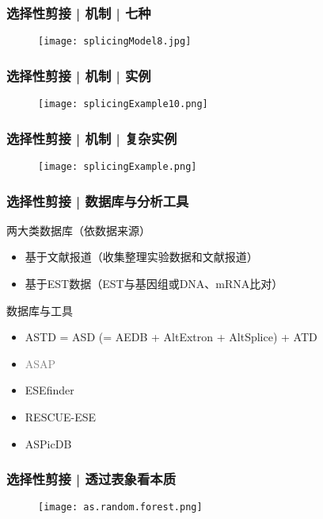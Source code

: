\begin{frame}
  \frametitle{选择性剪接 | \alert{机制} | 七种}
  \begin{figure}
    \centering
    \texttt{[image: splicingModel8.jpg]}
  \end{figure}
\end{frame}

\begin{frame}
  \frametitle{选择性剪接 | 机制 | 实例}
  \begin{figure}
    \centering
    \texttt{[image: splicingExample10.png]}
  \end{figure}
\end{frame}

\begin{frame}
  \frametitle{选择性剪接 | 机制 | 复杂实例}
  \begin{figure}
    \centering
    \texttt{[image: splicingExample.png]}
  \end{figure}
\end{frame}

\begin{frame}
  \frametitle{选择性剪接 | 数据库与分析工具}
  \begin{block}{两大类数据库（依数据来源）}
    \begin{itemize}
      \item 基于文献报道（收集整理实验数据和文献报道）
      \item 基于EST数据（EST与基因组或DNA、mRNA比对）
    \end{itemize}
  \end{block}
  \pause
  \begin{block}{数据库与工具}
  \begin{itemize}
    \item ASTD = ASD (= AEDB + AltExtron + AltSplice) + ATD
    \item \textcolor{gray}{ASAP}
    \item ESEfinder 
    \item RESCUE-ESE
    \item ASPicDB
  \end{itemize}
\end{block}
\end{frame}

\begin{frame}
  \frametitle{选择性剪接 | 透过表象看本质}
  \begin{figure}
    \centering
    \texttt{[image: as.random.forest.png]}
  \end{figure}
\end{frame}

